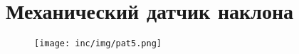 \chapter{Механический датчик наклона}
\label{cha:appendix5}

\begin{figure}
\centering
\texttt{[image: inc/img/pat5.png]}
\end{figure}

